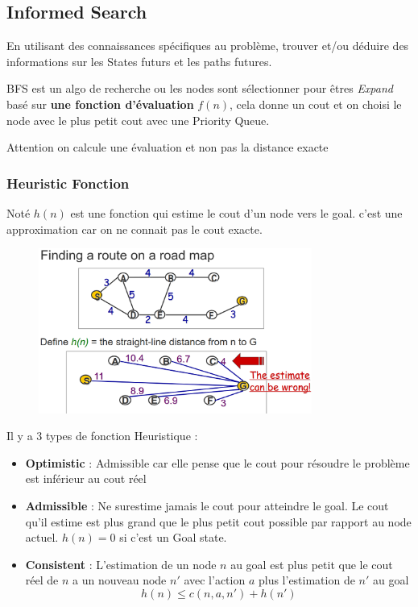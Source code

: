 	\subsection{Informed Search}
		En utilisant des connaissances spécifiques au problème, trouver et/ou déduire des informations sur les States futurs et les paths futures.
		
		BFS est un algo de recherche ou les nodes sont sélectionner pour êtres \textit{Expand} basé sur \textbf{une fonction d'évaluation} $f(n)$, cela donne un cout et on choisi le node avec le plus petit cout avec une Priority Queue.
		
		Attention on calcule une évaluation et non pas la distance exacte
		
		\subsubsection{Heuristic Fonction}
		
		Noté $h(n)$ est une fonction qui estime le cout d'un node vers le goal. c'est une approximation car on ne connait pas le cout exacte.
		\begin{figure}[htp]
			\centering
			\includegraphics[width=0.8\textwidth]{img/ExempleHeuristic.png}

		\end{figure}
		
		Il y a 3 types de fonction Heuristique :
		\begin{itemize}
			\item \textbf{Optimistic} : Admissible car elle pense que le cout pour résoudre le problème est inférieur au cout réel
			\item \textbf{Admissible} : Ne surestime jamais le cout pour atteindre le goal. Le cout qu'il estime est plus grand que le plus petit cout possible par rapport au node actuel. $h(n) = 0$ si c'est un Goal state.
			\item \textbf{Consistent} : L'estimation de un node $n$ au goal est plus petit que le cout réel de $n$ a un nouveau node $n'$ avec l'action $a$ plus l'estimation de $n'$ au goal 
			\begin{equation}
				h(n) \leq c(n,a,n') + h(n')
			\end{equation}
		\end{itemize}
		
